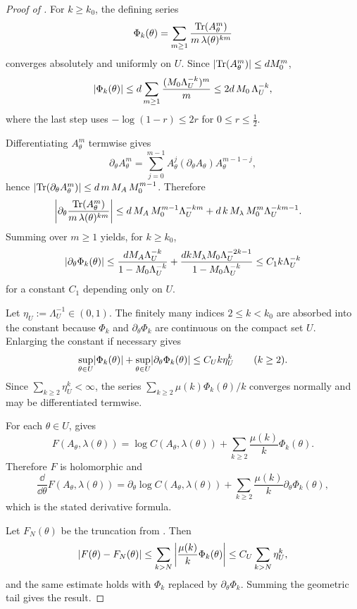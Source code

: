 \begin{proof}[Proof of ]
  For \(k\ge k_0\), the defining series
  \[
    \Phi_k(\theta)
    =\sum_{m\ge 1}\frac{\operatorname{Tr}(A_\theta^m)}{m\,\lambda(\theta)^{km}}
  \]
  converges absolutely and uniformly on \(U\). Since
  \(\lvert \operatorname{Tr}(A_\theta^m) \rvert\le dM_0^m\),
  \[
    \lvert \Phi_k(\theta) \rvert
    \le d\sum_{m\ge 1}\frac{(M_0\Lambda_U^{-k})^m}{m}
    \le 2d\,M_0\,\Lambda_U^{-k},
  \]
  where the last step uses
  \(-\log(1-r)\le 2r\) for \(0\le r\le \tfrac12\).

  Differentiating \(A_\theta^m\) termwise gives
  \[
    \partial_\theta A_\theta^m
    =\sum_{j=0}^{m-1}
      A_\theta^j(\partial_\theta A_\theta)A_\theta^{m-1-j},
  \]
  hence
  \(
    \lvert \operatorname{Tr}(\partial_\theta A_\theta^m) \rvert
    \le d\,m\,M_A\,M_0^{m-1}
  \).
  Therefore
  \begin{align*}
    \left|
      \partial_\theta
      \frac{\operatorname{Tr}(A_\theta^m)}{m\,\lambda(\theta)^{km}}
    \right|
    &\le
      d\,M_A\,M_0^{m-1}\Lambda_U^{-km}
      +d\,k\,M_\lambda\,M_0^m\Lambda_U^{-km-1}.
  \end{align*}
  Summing over \(m\ge 1\) yields, for \(k\ge k_0\),
  \[
    \lvert \partial_\theta\Phi_k(\theta) \rvert
    \le
    \frac{dM_A\Lambda_U^{-k}}{1-M_0\Lambda_U^{-k}}
    +\frac{d k M_\lambda M_0\Lambda_U^{-2k-1}}
          {1-M_0\Lambda_U^{-k}}
    \le C_1 k \Lambda_U^{-k}
  \]
  for a constant \(C_1\) depending only on \(U\).

  Let \(\eta_U:=\Lambda_U^{-1}\in(0,1)\). The finitely many indices
  \(2\le k<k_0\) are absorbed into the constant because
  \(\Phi_k\) and \(\partial_\theta\Phi_k\) are continuous on the compact
  set \(U\). Enlarging the constant if necessary gives
  \[
    \sup_{\theta\in U}\lvert \Phi_k(\theta) \rvert
    +\sup_{\theta\in U}\lvert \partial_\theta\Phi_k(\theta) \rvert
    \le C_U k \eta_U^k
    \qquad (k\ge 2).
  \]
  Since \(\sum_{k\ge 2}\eta_U^k<\infty\), the series
  \(\sum_{k\ge 2}\mu(k)\Phi_k(\theta)/k\) converges normally and may be
  differentiated termwise.

  For each \(\theta\in U\),  gives
  \[
    F(A_\theta,\lambda(\theta))
    =\log C(A_\theta,\lambda(\theta))
      +\sum_{k\ge 2}\frac{\mu(k)}{k}\Phi_k(\theta).
  \]
  Therefore \(F\) is holomorphic and
  \[
    \frac{\dd}{\dd\theta}F(A_\theta,\lambda(\theta))
    =\partial_\theta\log C(A_\theta,\lambda(\theta))
      +\sum_{k\ge 2}\frac{\mu(k)}{k}\partial_\theta\Phi_k(\theta),
  \]
  which is the stated derivative formula.

  Let \(F_N(\theta)\) be the truncation from
  . Then
  \[
    \lvert F(\theta)-F_N(\theta) \rvert
    \le \sum_{k>N}\left|\frac{\mu(k)}{k}\Phi_k(\theta)\right|
    \le C_U\sum_{k>N}\eta_U^k,
  \]
  and the same estimate holds with \(\Phi_k\) replaced by
  \(\partial_\theta\Phi_k\). Summing the geometric tail gives the
  result.
\end{proof}
